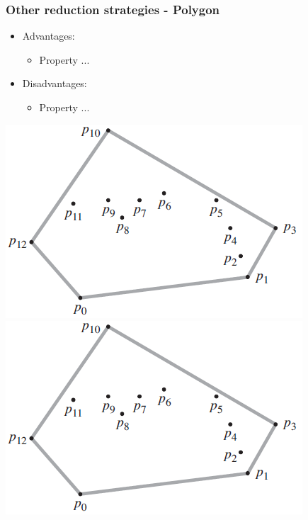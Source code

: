 \begin{frame}
\frametitle{Other reduction strategies - Polygon}
\begin{multicols}{2}
	\begin{itemize}
		\item Advantages:
		\begin{itemize}
			\item Property ...
		\end{itemize}
		\item Disadvantages:
		\begin{itemize}
			\item Property ...
		\end{itemize}
	\end{itemize}
\columnbreak
	\begin{center}
		\includegraphics[scale=0.5]{graphics/convexHull-example}\\
		\includegraphics[scale=0.5]{graphics/convexHull-example}
	\end{center}
\end{multicols}
\end{frame}
